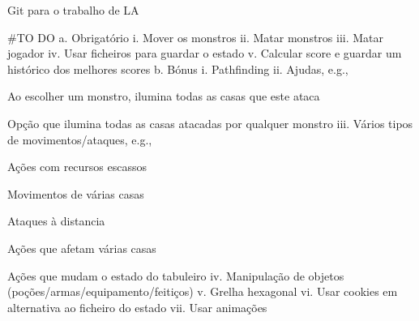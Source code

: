 Git para o trabalho de LA

\#\+TO DO a. Obrigatório i. Mover os monstros ii. Matar monstros iii. Matar jogador iv. Usar ficheiros para guardar o estado v. Calcular score e guardar um histórico dos melhores scores b. Bónus i. Pathfinding ii. Ajudas, e.\+g.,
\begin{DoxyEnumerate}
\item Ao escolher um monstro, ilumina todas as casas que este ataca
\item Opção que ilumina todas as casas atacadas por qualquer monstro iii. Vários tipos de movimentos/ataques, e.\+g.,
\end{DoxyEnumerate}
\begin{DoxyEnumerate}
\item Ações com recursos escassos
\item Movimentos de várias casas
\item Ataques à distancia
\item Ações que afetam várias casas
\item Ações que mudam o estado do tabuleiro iv. Manipulação de objetos (poções/armas/equipamento/feitiços) v. Grelha hexagonal vi. Usar cookies em alternativa ao ficheiro do estado vii. Usar animações 
\end{DoxyEnumerate}